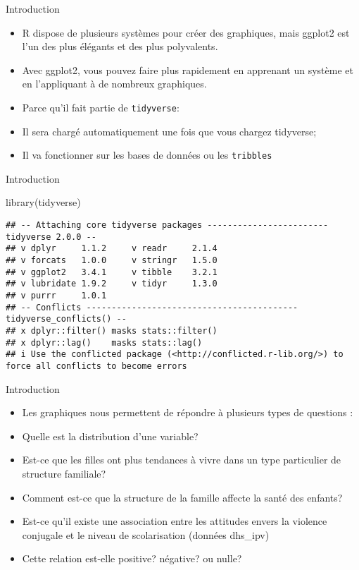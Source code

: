 \documentclass[
  ignorenonframetext,
]{beamer}
\newenvironment{Shaded}{\begin{snugshade}}{\end{snugshade}}
\newcommand{\FunctionTok}[1]{\textcolor[rgb]{0.00,0.00,0.00}{#1}}
\newcommand{\NormalTok}[1]{#1}
\begin{document}
\begin{frame}[fragile]{Introduction}
\protect\hypertarget{introduction-1}{}
\begin{itemize}
\item
  R dispose de plusieurs systèmes pour créer des graphiques, mais
  ggplot2 est l'un des plus élégants et des plus polyvalents.
\item
  Avec ggplot2, vous pouvez faire plus rapidement en apprenant un
  système et en l'appliquant à de nombreux graphiques.
\item
  Parce qu'il fait partie de \texttt{tidyverse}:
\item
  Il sera chargé automatiquement une fois que vous chargez tidyverse;
\item
  Il va fonctionner sur les bases de données ou les \texttt{tribbles}
\end{itemize}
\end{frame}

\begin{frame}[fragile]{Introduction}
\protect\hypertarget{introduction-2}{}
\begin{Shaded}
\begin{Highlighting}[]
\FunctionTok{library}\NormalTok{(tidyverse)}
\end{Highlighting}
\end{Shaded}

\begin{verbatim}
## -- Attaching core tidyverse packages ------------------------ tidyverse 2.0.0 --
## v dplyr     1.1.2     v readr     2.1.4
## v forcats   1.0.0     v stringr   1.5.0
## v ggplot2   3.4.1     v tibble    3.2.1
## v lubridate 1.9.2     v tidyr     1.3.0
## v purrr     1.0.1     
## -- Conflicts ------------------------------------------ tidyverse_conflicts() --
## x dplyr::filter() masks stats::filter()
## x dplyr::lag()    masks stats::lag()
## i Use the conflicted package (<http://conflicted.r-lib.org/>) to force all conflicts to become errors
\end{verbatim}
\end{frame}

\begin{frame}{Introduction}
\protect\hypertarget{introduction-3}{}
\begin{itemize}
\item
  Les graphiques nous permettent de répondre à plusieurs types de
  questions :
\item
  Quelle est la distribution d'une variable?
\item
  Est-ce que les filles ont plus tendances à vivre dans un type
  particulier de structure familiale?
\item
  Comment est-ce que la structure de la famille affecte la santé des
  enfants?
\item
  Est-ce qu'il existe une association entre les attitudes envers la
  violence conjugale et le niveau de scolarisation (données dhs\_ipv)
\item
  Cette relation est-elle positive? négative? ou nulle?
\end{itemize}
\end{frame}
\end{document}
